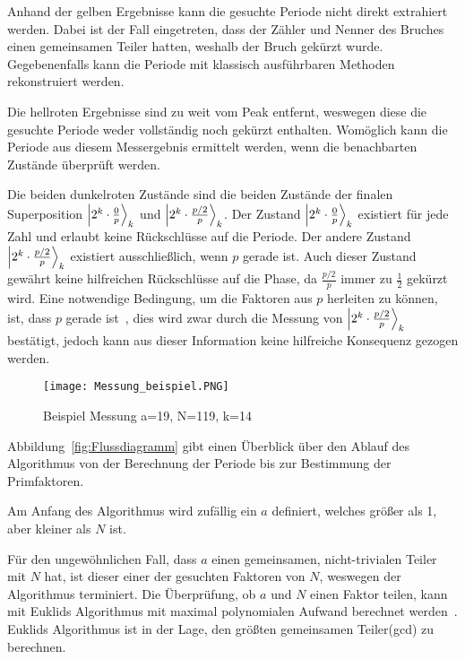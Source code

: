 Anhand der gelben Ergebnisse kann die gesuchte Periode nicht direkt extrahiert werden.
Dabei ist der Fall eingetreten, dass der Zähler und Nenner des Bruches einen gemeinsamen Teiler hatten, 
weshalb der Bruch gekürzt wurde.
Gegebenenfalls kann die Periode mit klassisch ausführbaren Methoden rekonstruiert werden.

Die hellroten Ergebnisse sind zu weit vom Peak entfernt,
weswegen diese die gesuchte Periode weder vollständig noch gekürzt enthalten.
Womöglich kann die Periode aus diesem Messergebnis ermittelt werden, 
wenn die benachbarten Zustände überprüft werden.

Die beiden dunkelroten Zustände sind die beiden Zustände der finalen Superposition
\(\ket{2^k \cdot \frac{0}{p}}_k\) und \(\ket{2^k \cdot \frac{p/2}{p}}_k\).
Der Zustand \(\ket{2^k \cdot \frac{0}{p}}_k\) existiert für jede Zahl und erlaubt keine 
Rückschlüsse auf die Periode.
Der andere Zustand \(\ket{2^k \cdot \frac{p/2}{p}}_k\) existiert ausschließlich, wenn \(p\) gerade ist.
Auch dieser Zustand gewährt keine hilfreichen Rückschlüsse auf die Phase, 
da \(\frac{p/2}{p}\) immer zu \(\frac{1}{2}\) gekürzt wird.
Eine notwendige Bedingung, um die Faktoren aus \(p\) herleiten zu können, 
ist, dass \(p\) gerade ist~\cite*{Shor_1997}, 
dies wird zwar durch die Messung von \(\ket{2^k \cdot \frac{p/2}{p}}_k\) bestätigt, 
jedoch kann aus dieser Information keine hilfreiche Konsequenz gezogen werden.

\begin{figure}[H]
  \centering
  \texttt{[image: Messung\_beispiel.PNG]}
  \caption{Beispiel Messung a=19, N=119, k=14}
  \label{fig:shor_measure}
\end{figure}

\vspace{1em}

Abbildung~\ref{fig:Flussdiagramm} gibt einen Überblick über den Ablauf des Algorithmus 
von der Berechnung der Periode bis zur Bestimmung der Primfaktoren.

Am Anfang des Algorithmus wird zufällig ein \(a\) definiert, 
welches größer als 1, aber kleiner als \(N\) ist.

Für den ungewöhnlichen Fall, dass \(a\) einen gemeinsamen, nicht-trivialen Teiler mit \(N\) hat, 
ist dieser einer der gesuchten Faktoren von \(N\), 
weswegen der Algorithmus terminiert.
Die Überprüfung, ob \(a\) und \(N\) einen Faktor teilen, 
kann mit Euklids Algorithmus mit maximal polynomialen Aufwand berechnet werden~\cite[301]{homeister2023quantum215}. 
Euklids Algorithmus ist in der Lage, den größten gemeinsamen Teiler(gcd) zu berechnen.

